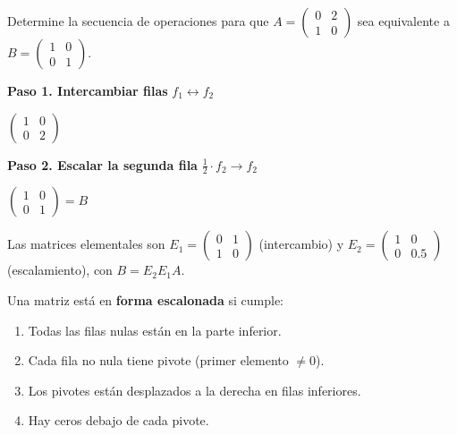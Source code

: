 \begin{example}\label{ex:equiv2}
Determine la secuencia de operaciones para que $A = \begin{pmatrix} 0 & 2 \\ 1 & 0 \end{pmatrix}$ sea equivalente a $B = \begin{pmatrix} 1 & 0 \\ 0 & 1 \end{pmatrix}.$
\begin{myproof}
\textbf{Paso 1. Intercambiar filas} $f_1 \leftrightarrow f_2$

$\begin{pmatrix} 1 & 0 \\ 0 & 2 \end{pmatrix}$

\textbf{Paso 2. Escalar la segunda fila} $\frac{1}{2} \cdot f_2 \to f_2$

$\begin{pmatrix} 1 & 0 \\ 0 & 1 \end{pmatrix} = B$

Las matrices elementales son $E_1 = \begin{pmatrix} 0 & 1 \\ 1 & 0 \end{pmatrix}$ (intercambio) y $E_2 = \begin{pmatrix} 1 & 0 \\ 0 & 0.5 \end{pmatrix}$ (escalamiento), con $\boxed{B = E_2 E_1 A}$.
\end{myproof}
\end{example}

\begin{definition}\label{def:escalonada}
Una matriz está en \textbf{forma escalonada} si cumple:
\begin{enumerate}
\item Todas las filas nulas están en la parte inferior.
\item Cada fila no nula tiene pivote (primer elemento $\neq 0$).
\item Los pivotes están desplazados a la derecha en filas inferiores.
\item Hay ceros debajo de cada pivote.
\end{enumerate}
\end{definition}

